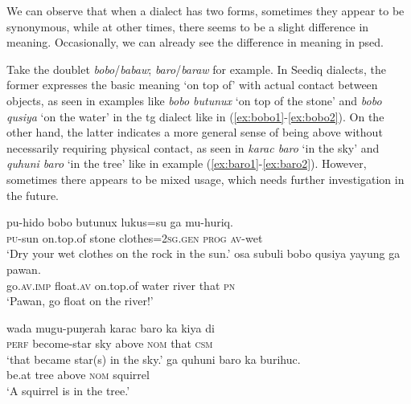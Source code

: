 We can observe that when a dialect has two forms, sometimes they appear to be synonymous, while at other times, there seems to be a slight difference in meaning. Occasionally, we can already see the difference in meaning in \acl{psed}.

Take the doublet \textit{bobo}/\textit{babaw}; \textit{baro}/\textit{baraw} for example. In Seediq dialects, the former expresses the basic meaning `on top of' with actual contact between objects, as seen in examples like \textit{bobo butunux} `on top of the stone' and \textit{bobo qusiya} `on the water' in the \acl{tg} dialect like in (\ref{ex:bobo1}-\ref{ex:bobo2}). On the other hand, the latter indicates a more general sense of being above without necessarily requiring physical contact, as seen in \textit{karac baro} `in the sky' and \textit{quhuni baro} `in the tree' like in example (\ref{ex:baro1}-\ref{ex:baro2}). However, sometimes there appears to be mixed usage, which needs further investigation in the future.

\begin{exe}
    \ex 
    \begin{xlist}
        \ex \textcite{ILRDFEdict} \label{ex:bobo1}
        \gll pu-hido bobo butunux lukus=su ga mu-huriq. \\
        \textsc{pu}-sun on.top.of stone clothes=\textsc{2sg.gen} \textsc{prog} \textsc{av}-wet\\
        \glt `Dry your wet clothes on the rock in the sun.'
        \ex \textcite{ILRDFEdict} \label{ex:bobo2}
        \gll osa subuli bobo qusiya yayung ga pawan. \\
        go\textsc{.av.imp} float\textsc{.av} on.top.of water river that \textsc{\acs{pn}} \\
        \glt `Pawan, go float on the river!'
    \end{xlist}
    \ex 
    \begin{xlist}
        \ex \textcite[221]{Sung2018Sedgrammar} \label{ex:baro1}
        \gll wada mugu-puŋerah karac baro ka kiya di \\
        \textsc{\acs{perf}} become-star sky above \textsc{\acs{nom}} that \textsc{\acs{csm}}\\
        \glt `that became star(s) in the sky.'
        \ex \textcite{ILRDFEdict} \label{ex:baro2}
        \gll ga quhuni baro ka burihuc. \\
        be.at tree above \textsc{\acs{nom}} squirrel \\
        \glt `A squirrel is in the tree.'
    \end{xlist}
\end{exe}

